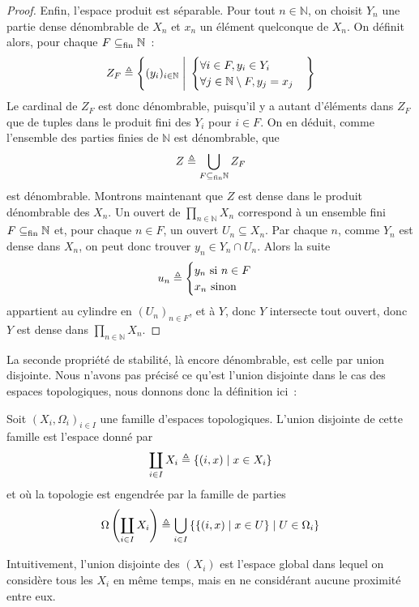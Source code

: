 \begin{proof}
  Enfin, l'espace produit est séparable. Pour tout $n \in \mathbb N$, on
  choisit $Y_n$ une partie dense dénombrable de $X_n$ et $x_n$ un élément
  quelconque de $X_n$. On définit alors, pour chaque $F\subseteq_{\mathrm{fin}} \mathbb N$~:
  \[Z_F \triangleq \left\{ (y_i)_{i \in \mathbb N} \;\Bigg|\; \begin{cases}
    \forall i \in F, y_i \in Y_i\\
    \forall j \in \mathbb N \setminus F, y_j = x_j
  \end{cases}\right\}\]
  Le cardinal de $Z_F$ est donc dénombrable, puisqu'il y a autant d'éléments
  dans $Z_F$ que de tuples dans le produit fini des $Y_i$ pour $i \in F$. On
  en déduit, comme l'ensemble des parties finies de $\mathbb N$ est dénombrable,
  que
  \[Z \triangleq \bigcup_{F\subseteq_{\mathrm{fin}} \mathbb N} Z_F\]
  est dénombrable. Montrons maintenant que $Z$ est dense dans le produit
  dénombrable des $X_n$. Un ouvert de
  $\displaystyle\prod_{n \in \mathbb N} X_n$
  correspond à un ensemble fini $F\subseteq_{\mathrm{fin}} \mathbb N$ et, pour chaque
  $n \in F$, un ouvert $U_n \subseteq X_n$. Par chaque $n$, comme $Y_n$ est
  dense dans $X_n$, on peut donc trouver $y_n \in Y_n \cap U_n$. Alors
  la suite
  \[u_n \triangleq \begin{cases} y_n\text{ si } n \in F \\
    x_n \text{ sinon}\end{cases}\]
  appartient au cylindre en $(U_n)_{n \in F}$, et à $Y$, donc $Y$ intersecte
  tout ouvert, donc $Y$ est dense dans
  $\displaystyle \prod_{n \in \mathbb N} X_n$.
\end{proof}

La seconde propriété de stabilité, là encore dénombrable, est celle par union
disjointe. Nous n'avons pas précisé ce qu'est l'union disjointe dans le cas des
espaces topologiques, nous donnons donc la définition ici~:

\begin{definition}
  Soit $(X_i,\Omega_i)_{i\in I}$ une famille d'espaces topologiques. L'union
  disjointe de cette famille est l'espace donné par
  \[\coprod_{i\in I} X_i \triangleq \{(i,x)\mid x \in X_i\}\]
  et où la topologie est engendrée par la famille de parties
  \[\Omega\left(\coprod_{i\in I} X_i\right)\triangleq
  \bigcup_{i \in I}\left\{\{(i,x)\mid x\in U\}\mid U\in\Omega_i\right\}\]
\end{definition}

Intuitivement, l'union disjointe des $(X_i)$ est l'espace global dans lequel
on considère tous les $X_i$ en même temps, mais en ne considérant aucune
proximité entre eux.

